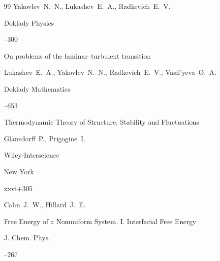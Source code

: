 \begin{thebibliography}{99}
\by Yakovlev~N.~N., Lukashev~E.~A., Radkevich~E.~V.

\jour Doklady Physics




--300










\paper On problems of the laminar–turbulent transition

\by Lukashev~E.~A., Yakovlev~N.~N., Radkevich~E.~V., Vasil'yeva~O.~A.

\jour Doklady Mathematics




--653








\book Thermodynamic Theory of Structure, Stability and Fluctuations

\by  Glansdorff~P.,  Prigogine~I.

\publ Wiley-Interscience

\publaddr New York


\totalpages xxvi+305






\by Cahn~J.~W., Hillard~J.~E.

\paper Free Energy of a Nonuniform System. I. Interfacial Free Energy

\jour J. Chem. Phys.




--267



\end{thebibliography}
